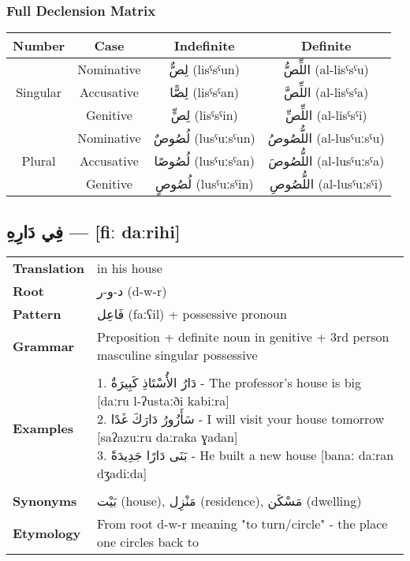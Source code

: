 \documentclass[letterpaper,12pt]{article}
\begin{document}
\subsubsection*{Full Declension Matrix}
\begin{tabular}{|c|c|c|c|}
\hline
\textbf{Number} & \textbf{Case} & \textbf{Indefinite} & \textbf{Definite} \\
\hline
\multirow{3}{*}{Singular}
 & Nominative   & \textarabic{لِصٌّ} (lisˤsˤun) & \textarabic{اللِّصُّ} (al-lisˤsˤu) \\
 & Accusative   & \textarabic{لِصًّا} (lisˤsˤan) & \textarabic{اللِّصَّ} (al-lisˤsˤa) \\
 & Genitive     & \textarabic{لِصٍّ} (lisˤsˤin) & \textarabic{اللِّصِّ} (al-lisˤsˤi) \\
\hline
\multirow{3}{*}{Plural}
 & Nominative   & \textarabic{لُصُوصٌ} (lusˤuːsˤun) & \textarabic{اللُّصُوصُ} (al-lusˤuːsˤu) \\
 & Accusative   & \textarabic{لُصُوصًا} (lusˤuːsˤan) & \textarabic{اللُّصُوصَ} (al-lusˤuːsˤa) \\
 & Genitive     & \textarabic{لُصُوصٍ} (lusˤuːsˤin) & \textarabic{اللُّصُوصِ} (al-lusˤuːsˤi) \\
\hline
\end{tabular}

\subsection{\textarabic{فِي دَارِهِ} — [fiː daːrihi]}
\begin{tabular}{p{3cm}p{10cm}}
\toprule
\textbf{Translation} & in his house \\
\textbf{Root} & \textarabic{د-و-ر} (d-w-r) \\
\textbf{Pattern} & \textarabic{فَاعِل} (faːʕil) + possessive pronoun \\
\textbf{Grammar} & Preposition + definite noun in genitive + 3rd person masculine singular possessive \\
\midrule \\
\textbf{Examples} & \makecell[l]{\parbox{9.5cm}{
1. \textarabic{دَارُ الأُسْتَاذِ كَبِيرَةٌ} - The professor's house is big [daːru l-ʔustaːði kabiːra]\\
2. \textarabic{سَأَزُورُ دَارَكَ غَدًا} - I will visit your house tomorrow [saʔazuːru daːraka ɣadan]\\
3. \textarabic{بَنَى دَارًا جَدِيدَةً} - He built a new house [banaː daːran dʒadiːda]
}} \\
\midrule \\
\textbf{Synonyms} & \textarabic{بَيْت} (house), \textarabic{مَنْزِل} (residence), \textarabic{مَسْكَن} (dwelling) \\
\textbf{Etymology} & From root d-w-r meaning "to turn/circle" - the place one circles back to \\
\bottomrule
\end{tabular}
\end{document}
